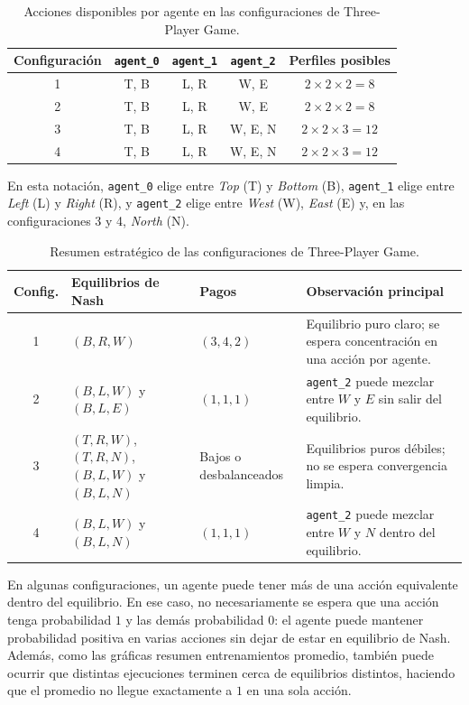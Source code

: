 \documentclass[letterpaper,12pt]{article} %
\begin{document}
\begin{table}[H]
\centering
\begin{tabular}{c|c|c|c|c}
\hline
Configuración & \texttt{agent\_0} & \texttt{agent\_1} & \texttt{agent\_2} & Perfiles posibles \\
\hline
1 & T, B & L, R & W, E & $2 \times 2 \times 2 = 8$ \\
2 & T, B & L, R & W, E & $2 \times 2 \times 2 = 8$ \\
3 & T, B & L, R & W, E, N & $2 \times 2 \times 3 = 12$ \\
4 & T, B & L, R & W, E, N & $2 \times 2 \times 3 = 12$ \\
\hline
\end{tabular}
\caption{Acciones disponibles por agente en las configuraciones de Three-Player Game.}
\end{table}

En esta notación, \texttt{agent\_0} elige entre \textit{Top} (T) y \textit{Bottom} (B), \texttt{agent\_1} elige entre \textit{Left} (L) y \textit{Right} (R), y \texttt{agent\_2} elige entre \textit{West} (W), \textit{East} (E) y, en las configuraciones 3 y 4, \textit{North} (N).

\begin{table}[H]
\centering
\begin{tabular}{c|p{4.2cm}|p{2.2cm}|p{6.2cm}}
\hline
Config. & Equilibrios de Nash & Pagos & Observación principal \\
\hline
1 & $(B,R,W)$ & $(3,4,2)$ & Equilibrio puro claro; se espera concentración en una acción por agente. \\
2 & $(B,L,W)$ y $(B,L,E)$ & $(1,1,1)$ & \texttt{agent\_2} puede mezclar entre $W$ y $E$ sin salir del equilibrio. \\
3 & $(T,R,W)$, $(T,R,N)$, $(B,L,W)$ y $(B,L,N)$ & Bajos o desbalanceados & Equilibrios puros débiles; no se espera convergencia limpia. \\
4 & $(B,L,W)$ y $(B,L,N)$ & $(1,1,1)$ & \texttt{agent\_2} puede mezclar entre $W$ y $N$ dentro del equilibrio. \\
\hline
\end{tabular}
\caption{Resumen estratégico de las configuraciones de Three-Player Game.}
\end{table}

En algunas configuraciones, un agente puede tener más de una acción equivalente dentro del equilibrio. En ese caso, no necesariamente se espera que una acción tenga probabilidad $1$ y las demás probabilidad $0$: el agente puede mantener probabilidad positiva en varias acciones sin dejar de estar en equilibrio de Nash. Además, como las gráficas resumen entrenamientos promedio, también puede ocurrir que distintas ejecuciones terminen cerca de equilibrios distintos, haciendo que el promedio no llegue exactamente a $1$ en una sola acción.
\end{document}
